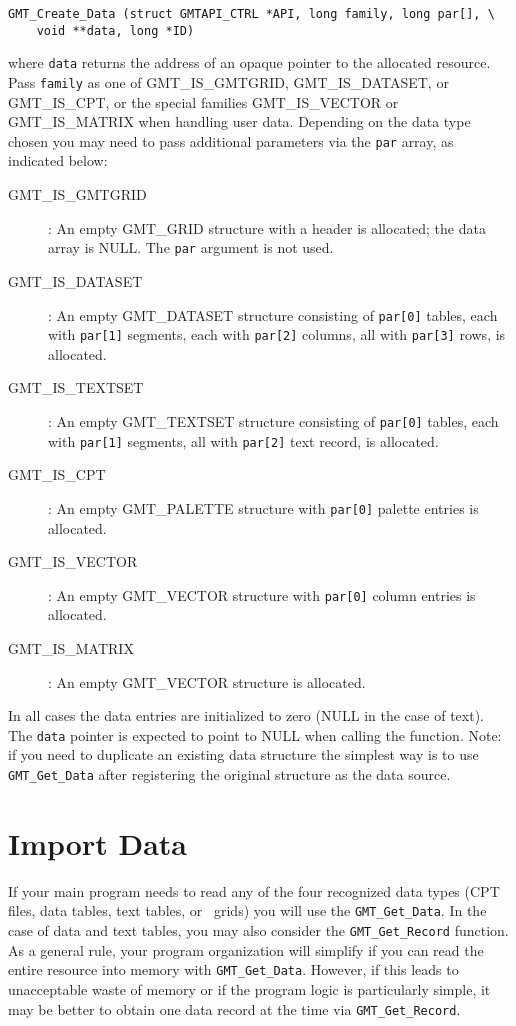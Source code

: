 \documentclass{report}
\begin{document}
\begin{verbatim}
GMT_Create_Data (struct GMTAPI_CTRL *API, long family, long par[], \
	void **data, long *ID)
\end{verbatim}
where \texttt{data} returns the address of an opaque pointer to the allocated resource.
Pass \texttt{family} as one of GMT\_IS\_GMTGRID, GMT\_IS\_DATASET, or GMT\_IS\_CPT,
or the special families GMT\_IS\_VECTOR or GMT\_IS\_MATRIX when handling user data.
Depending on the data type chosen you may need to pass additional parameters via
the \texttt{par} array, as indicated below:
\begin{description}
	\item [GMT\_IS\_GMTGRID]: An empty GMT\_GRID structure with a header is
	allocated; the data array is NULL.  The \texttt{par} argument is not used.
	\item [GMT\_IS\_DATASET]: An empty GMT\_DATASET structure consisting of
	\texttt{par[0]} tables, each with \texttt{par[1]} segments, each with
	\texttt{par[2]} columns, all with \texttt{par[3]} rows, is allocated.
	\item [GMT\_IS\_TEXTSET]: An empty GMT\_TEXTSET structure consisting of
	\texttt{par[0]} tables, each with \texttt{par[1]} segments,
	all with \texttt{par[2]} text record, is allocated.
	\item [GMT\_IS\_CPT]: An empty GMT\_PALETTE structure with \texttt{par[0]}
	palette entries is allocated.
	\item [GMT\_IS\_VECTOR]: An empty GMT\_VECTOR structure with \texttt{par[0]}
	column entries is allocated.
	\item [GMT\_IS\_MATRIX]: An empty GMT\_VECTOR structure is allocated.
\end{description}
In all cases the data entries are initialized to zero (NULL in the case of text).
The \texttt{data} pointer is expected to
point to NULL when calling the function.  Note: if you need to
duplicate an existing data structure the simplest way is to use \texttt{GMT\_Get\_Data}
after registering the original structure as the data source.

\section{Import Data}

If your main program needs to read any of the four recognized data types (CPT files, data tables, text tables, or \GMT\ grids)
you will use the \texttt{GMT\_Get\_Data}. In the case of data and text tables, you may also consider the
\texttt{GMT\_Get\_Record} function.
As a general rule, your program organization will simplify if you can read the entire resource into memory with
\texttt{GMT\_Get\_Data}.  However, if this leads to unacceptable waste of memory or if the program logic is particularly simple,
it may be better to obtain one data record at the time via \texttt{GMT\_Get\_Record}.
\end{document}
